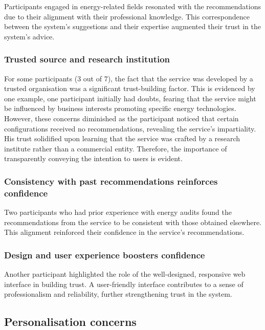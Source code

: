 Participants engaged in energy-related fields resonated with the recommendations due to their alignment with their professional knowledge. 
This correspondence between the system's suggestions and their expertise augmented their trust in the system's advice.


\subsubsection{Trusted source and research institution}

For some participants (3 out of 7), the fact that the service was developed by a trusted organisation was a significant trust-building factor.
This is evidenced by one example, one participant initially had doubts, fearing that the service might be influenced by business interests promoting specific energy technologies. 
However, these concerns diminished as the participant noticed that certain configurations received no recommendations, revealing the service's impartiality. 
His trust solidified upon learning that the service was crafted by a research institute rather than a commercial entity. 
Therefore, the importance of transparently conveying the intention to users is evident. 


\subsubsection{Consistency with past recommendations reinforces confidence}

Two participants who had prior experience with energy audits found the recommendations from the service to be consistent with those obtained elsewhere. 
This alignment reinforced their confidence in the service's recommendations.


\subsubsection{Design and user experience boosters confidence}

Another participant highlighted the role of the well-designed, responsive web interface in building trust. 
A user-friendly interface contributes to a sense of professionalism and reliability, further strengthening trust in the system.


\subsection{Personalisation concerns}

